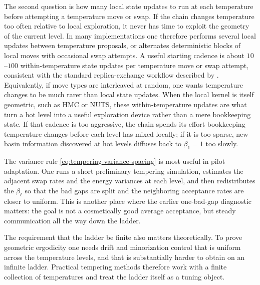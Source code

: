 The second question is how many local state updates to run at each temperature before attempting a temperature move or swap.
If the chain changes temperature too often relative to local exploration, it never has time to exploit the geometry of the current level.
In many implementations one therefore performs several local updates between temperature proposals, or alternates deterministic blocks of local moves with occasional swap attempts.
A useful starting cadence is about $10$--$100$ within-temperature state updates per temperature move or swap attempt, consistent with the standard replica-exchange workflow described by \citet[\S2.1]{earl_deem_2005_parallel_tempering}.
Equivalently, if move types are interleaved at random, one wants temperature changes to be much rarer than local state updates.
When the local kernel is itself geometric, such as HMC or NUTS, these within-temperature updates are what turn a hot level into a useful exploration device rather than a mere bookkeeping state.
If that cadence is too aggressive, the chain spends its effort bookkeeping temperature changes before each level has mixed locally; if it is too sparse, new basin information discovered at hot levels diffuses back to $\beta_1=1$ too slowly.

The variance rule \eqref{eq:tempering-variance-spacing} is most useful in pilot adaptation.
One runs a short preliminary tempering simulation, estimates the adjacent swap rates and the energy variances at each level, and then redistributes the $\beta_\ell$ so that the bad gaps are split and the neighboring acceptance rates are closer to uniform.
This is another place where the earlier one-bad-gap diagnostic matters:
the goal is not a cosmetically good average acceptance, but steady communication all the way down the ladder.

The requirement that the ladder be finite also matters theoretically.
To prove geometric ergodicity one needs drift and minorization control that is uniform across the temperature levels, and that is substantially harder to obtain on an infinite ladder.
Practical tempering methods therefore work with a finite collection of temperatures and treat the ladder itself as a tuning object.
